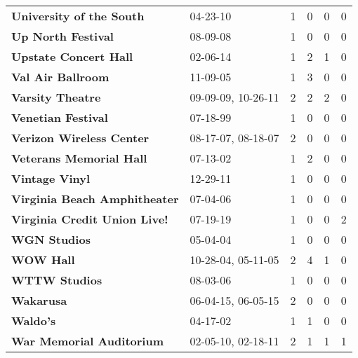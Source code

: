 \begin{supertabular}{p{0.4\textwidth}p{0.3\textwidth}p{0.05\textwidth}p{0.05\textwidth}p{0.05\textwidth}p{0.05\textwidth}}
                                     \textbf{University of the South} &            04-23-10 &  1 &  0 &  0 &  0 \\
                                           \textbf{Up North Festival} &            08-09-08 &  1 &  0 &  0 &  0 \\
                                        \textbf{Upstate Concert Hall} &            02-06-14 &  1 &  2 &  1 &  0 \\
                                            \textbf{Val Air Ballroom} &            11-09-05 &  1 &  3 &  0 &  0 \\
                                             \textbf{Varsity Theatre} &  09-09-09, 10-26-11 &  2 &  2 &  2 &  0 \\
                                           \textbf{Venetian Festival} &            07-18-99 &  1 &  0 &  0 &  0 \\
                                     \textbf{Verizon Wireless Center} &  08-17-07, 08-18-07 &  2 &  0 &  0 &  0 \\
                                      \textbf{Veterans Memorial Hall} &            07-13-02 &  1 &  2 &  0 &  0 \\
                                               \textbf{Vintage Vinyl} &            12-29-11 &  1 &  0 &  0 &  0 \\
                                 \textbf{Virginia Beach Amphitheater} &            07-04-06 &  1 &  0 &  0 &  0 \\
                                 \textbf{Virginia Credit Union Live!} &            07-19-19 &  1 &  0 &  0 &  2 \\
                                                 \textbf{WGN Studios} &            05-04-04 &  1 &  0 &  0 &  0 \\
                                                    \textbf{WOW Hall} &  10-28-04, 05-11-05 &  2 &  4 &  1 &  0 \\
                                                \textbf{WTTW Studios} &            08-03-06 &  1 &  0 &  0 &  0 \\
                                                    \textbf{Wakarusa} &  06-04-15, 06-05-15 &  2 &  0 &  0 &  0 \\
                                                     \textbf{Waldo's} &            04-17-02 &  1 &  1 &  0 &  0 \\
                                     \textbf{War Memorial Auditorium} &  02-05-10, 02-18-11 &  2 &  1 &  1 &  1 \\

\end{supertabular}
